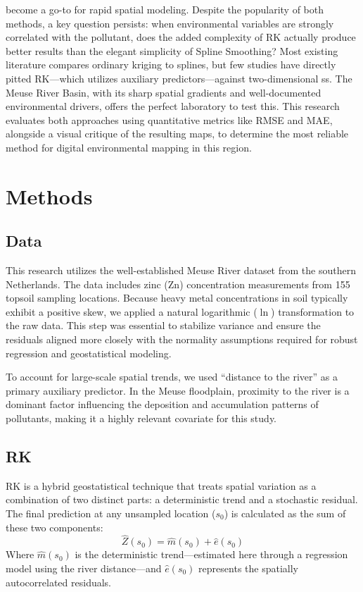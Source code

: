 \documentclass[twoside]{article}
\begin{document}
become a go-to for rapid spatial modeling\cite{Wahba1990}. Despite the popularity of both methods, a key question persists: when environmental variables are strongly correlated with the pollutant, does the added complexity of RK actually produce better results than the elegant simplicity of Spline Smoothing? Most existing literature compares ordinary kriging to splines, but few studies have directly pitted RK---which utilizes auxiliary predictors---against two-dimensional ss. The Meuse River Basin, with its sharp spatial gradients and well-documented environmental drivers, offers the perfect laboratory to test this. This research evaluates both approaches using quantitative metrics like RMSE and MAE, alongside a visual critique of the resulting maps, to determine the most reliable method for digital environmental mapping in this region.
\section{Methods}
\subsection{Data}
This research utilizes the well-established Meuse River dataset from the southern Netherlands. The data includes zinc (Zn) concentration measurements from 155 topsoil sampling locations. Because heavy metal concentrations in soil typically exhibit a positive skew, we applied a natural logarithmic ($\ln$) transformation to the raw data. This step was essential to stabilize variance and ensure the residuals aligned more closely with the normality assumptions required for robust regression and geostatistical modeling.

To account for large-scale spatial trends, we used ``distance to the river'' as a primary auxiliary predictor. In the Meuse floodplain, proximity to the river is a dominant factor influencing the deposition and accumulation patterns of pollutants, making it a highly relevant covariate for this study.
\subsection{RK}
RK is a hybrid geostatistical technique that treats spatial variation as a combination of two distinct parts: a deterministic trend and a stochastic residual. The final prediction at any unsampled location ($s_0$) is calculated as the sum of these two components:
\begin{equation}
\hat{Z}(s_0) = \hat{m}(s_0) + \hat{e}(s_0)
\end{equation}
Where $\hat{m}(s_0)$ is the deterministic trend---estimated here through a regression model using the river distance---and $\hat{e}(s_0)$ represents the spatially autocorrelated residuals. 
\end{document}
